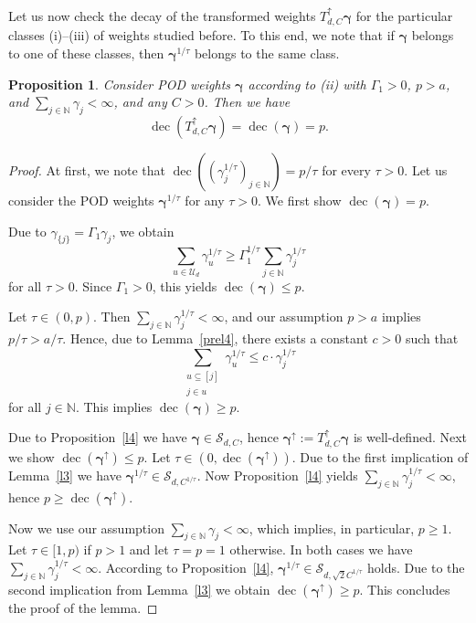 \documentclass{article}
\newcommand{\N}  {{\mathbb N}}
\newcommand{\bg}{{\boldsymbol{\gamma}}}
\newcommand{\U}  {\mathcal{U}}
\newcommand{\SSS}{\mathcal{S}}
\newcommand{\up}{\uparrow}
\DeclareMathOperator{\decay}{dec}
\theoremstyle{plain}
\newtheorem{prop}{Proposition}
\theoremstyle{definition}
\begin{document}
Let us now check the decay of the transformed weights $T^\up_{d,C} \bg$ 
for the particular classes (i)--(iii) of weights studied before.
To this end, we note that if $\bg$ belongs to one of these
classes, then $\bg^{1/\tau}$ belongs to the same class. 

\begin{prop}\label{le:decay_POD}
Consider POD weights $\bg$ according to (ii) with $\Gamma_1 >0$, 
$p > a$, and $\sum_{j\in\N} \gamma_j < \infty$, and any $C>0$.
Then we have
\[
\decay \left(T^{\up}_{d,C} \bg\right) = \decay (\bg) = p.
\]
\end{prop}

\begin{proof}
At first, we note that
$\decay ((\gamma_j^{1/\tau})_{j\in\N}) = p / \tau$ for
every $\tau > 0$. 
Let us consider the POD weights $\bg^{1/\tau}$ for any $\tau > 0$.
We first show $\decay(\bg) = p$. 

Due to $\gamma_{\{j\}} = \Gamma_1 \gamma_j$, we obtain 
\[
\sum_{u\in\U_d} \gamma_u^{1/\tau} \ge 
\Gamma_1^{1/\tau} \sum_{j\in\N} \gamma_j^{1/\tau}
\] 
for all $\tau >0$. Since $\Gamma_1 >0$, this yields $\decay(\bg) \le p$. 

Let $\tau \in (0, p)$. Then $\sum_{j\in\N} \gamma_j^{1/\tau} < \infty$, 
and our assumption $p>a$ implies $p/\tau > a/\tau$. Hence, due to 
Lemma~\ref{prel4}, there exists a constant $c >0$ such that 
\[
\sum_{\substack{u \subseteq [j] \\ j\in u}}  \gamma_u^{1/\tau} \le 
c  \cdot \gamma_j^{1/\tau}
\]
for all $j\in\N$. This implies $\decay(\bg) \ge p$. 

Due to Proposition~\ref{l4} we have 
$\bg \in \SSS_{d, C}$, hence $\bg^\up :=
T^\up_{d, C} \bg$ is well-defined.
Next we show $\decay(\bg^\up) \le p$.
Let $\tau \in (0,\decay(\bg^\up))$. Due to the first implication 
of Lemma~\ref{l3} we have $\bg^{1/\tau} \in \SSS_{d,C^{1/\tau}}$.
Now Proposition~\ref{l4}
yields $\sum_{j\in\N} \gamma_j^{1/\tau} < \infty$, hence
$p \geq \decay(\bg^\up)$.

Now we use our assumption $\sum_{j\in\N} \gamma_j < \infty$, 
which 
implies, in particular, $p\ge 1$. Let $\tau \in [1,p)$ if $p>1$ and let 
$\tau = p =1$ otherwise.
In both cases we have $\sum_{j\in\N} \gamma_j^{1/\tau} < \infty$.
According to Proposition~\ref{l4}, 
$\bg^{1/\tau} \in \SSS_{d,\sqrt{2} C^{1/\tau}}$ holds.
Due to the second implication from
Lemma~\ref{l3} we obtain $\decay(\bg^\up) \geq p$.
This concludes the proof of the lemma.
\end{proof}
\end{document}
